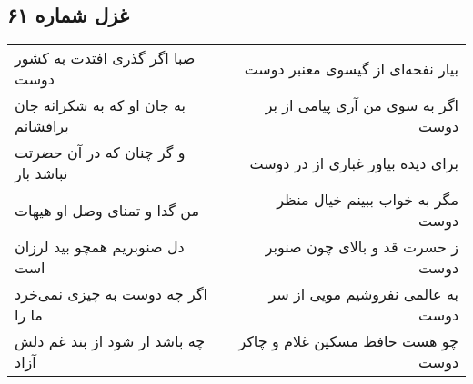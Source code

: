 \begin{center}
\section*{غزل شماره ۶۱}
\label{sec:sh061}
\begin{longtable}{l p{0.5cm} r}
صبا اگر گذری افتدت به کشور دوست
&&
بیار نفحه‌ای از گیسوی معنبر دوست
\\
به جان او که به شکرانه جان برافشانم
&&
اگر به سوی من آری پیامی از بر دوست
\\
و گر چنان که در آن حضرتت نباشد بار
&&
برای دیده بیاور غباری از در دوست
\\
من گدا و تمنای وصل او هیهات
&&
مگر به خواب ببینم خیال منظر دوست
\\
دل صنوبریم همچو بید لرزان است
&&
ز حسرت قد و بالای چون صنوبر دوست
\\
اگر چه دوست به چیزی نمی‌خرد ما را
&&
به عالمی نفروشیم مویی از سر دوست
\\
چه باشد ار شود از بند غم دلش آزاد
&&
چو هست حافظ مسکین غلام و چاکر دوست
\\
\end{longtable}
\end{center}
